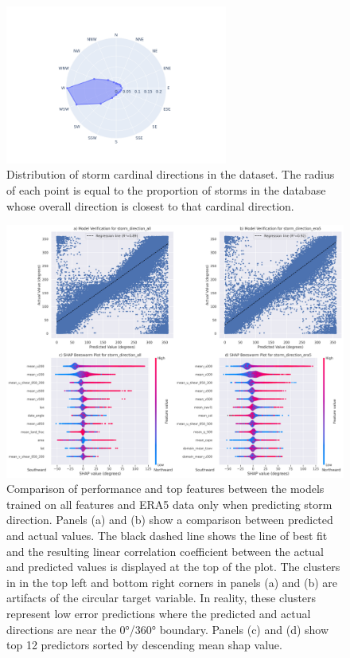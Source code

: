 \begin{figure}[ht]
    \centering
    \includegraphics[width=0.65\textwidth]{../figures/generated/exploration/storm_cardinal_directions_distribution.png}
    \caption{Distribution of storm cardinal directions in the dataset. The radius of each point is equal to the proportion of storms in the database whose overall direction is closest to that cardinal direction.}
    \label{fig:storm_cardinal_directions_distribution}
\end{figure}

\begin{figure}[ht]
    \centering
    \includegraphics[width=\textwidth]{../figures/generated/experiments/storm_direction/storm_direction_summary.png}
    \caption{Comparison of performance and top features between the models trained on all features and ERA5 data only when predicting storm direction. Panels (a) and (b) show a comparison between predicted and actual values. The black dashed line shows the line of best fit and the resulting linear correlation coefficient between the actual and predicted values is displayed at the top of the plot. The clusters in in the top left and bottom right corners in panels (a) and (b) are artifacts of the circular target variable. In reality, these clusters represent low error predictions where the predicted and actual directions are near the \ang{0}/\ang{360} boundary. Panels (c) and (d) show top 12 predictors sorted by descending mean \acrshort{shap} value.}
    \label{fig:storm_direction_summary}
\end{figure}

